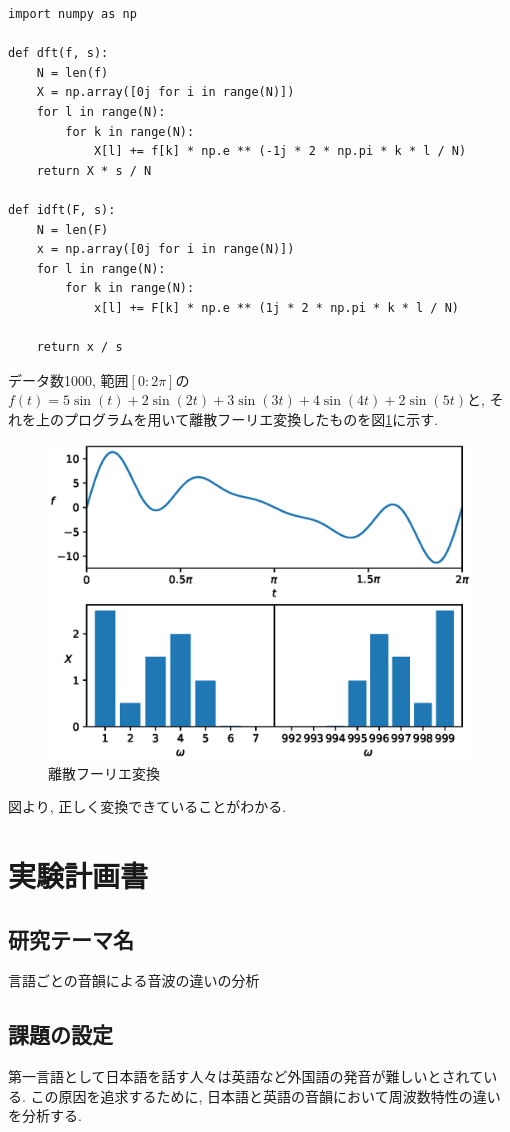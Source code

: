 \documentclass[titlepage]{jsarticle}
\begin{document}
    \begin{lstlisting}[caption=フーリエ変換, label=src:dft]
import numpy as np

def dft(f, s):
    N = len(f)
    X = np.array([0j for i in range(N)])
    for l in range(N):
        for k in range(N):
            X[l] += f[k] * np.e ** (-1j * 2 * np.pi * k * l / N)
    return X * s / N

def idft(F, s):
    N = len(F)
    x = np.array([0j for i in range(N)])
    for l in range(N):
        for k in range(N):
            x[l] += F[k] * np.e ** (1j * 2 * np.pi * k * l / N)
        
    return x / s\end{lstlisting}

    データ数1000, 範囲$[0:2\pi]$の$f(t) = 5\sin(t) + 2\sin(2t) + 3\sin(3t) + 4\sin(4t) + 2\sin(5t)$と,
    それを上のプログラムを用いて離散フーリエ変換したものを図\ref{fig:fourier}に示す.

    \begin{figure}[h]
        \centering
        \includegraphics[width=0.8\hsize]{img/fourier1.eps}
        \caption{離散フーリエ変換}
        \label{fig:fourier}
    \end{figure}

    図より, 正しく変換できていることがわかる.

\section{実験計画書}
    \subsection{研究テーマ名}
        言語ごとの音韻による音波の違いの分析

    \subsection{課題の設定}
        第一言語として日本語を話す人々は英語など外国語の発音が難しいとされている.
        この原因を追求するために,
        日本語と英語の音韻において周波数特性の違いを分析する.
\end{document}
